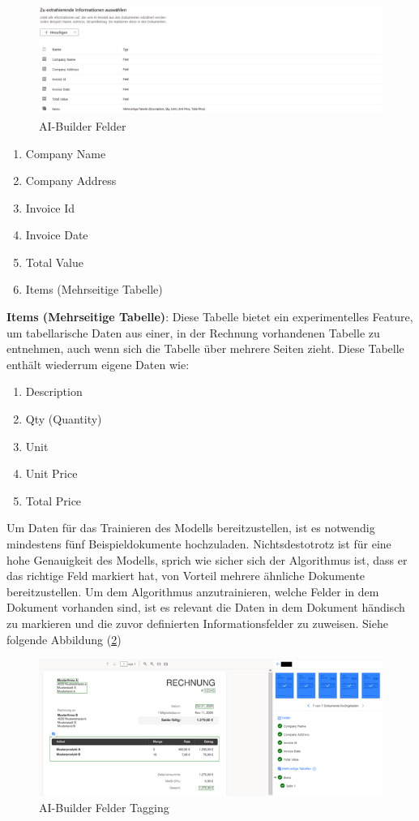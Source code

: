 \begin{figure}[h]
    \centering
    \includegraphics[scale=0.5]{sections/cloud-computing/images/ai-builder-fields.png}
    \caption{AI-Builder Felder}
    \label{fig:ai-builder-fields-figure}
\end{figure}

\begin{enumerate}
    \item Company Name
    \item Company Address
    \item Invoice Id
    \item Invoice Date
    \item Total Value
    \item Items (Mehrseitige Tabelle)
\end{enumerate}

\textbf{Items (Mehrseitige Tabelle)}: Diese Tabelle bietet ein experimentelles Feature, um tabellarische Daten aus einer, in der Rechnung vorhandenen Tabelle zu entnehmen, auch wenn sich die Tabelle über mehrere Seiten zieht. Diese Tabelle enthält wiederrum eigene Daten wie:

\label{enum:InvoiceItemsAttributs}
\begin{enumerate}
    \item Description
    \item Qty (Quantity)
    \item Unit
    \item Unit Price
    \item Total Price
\end{enumerate}


Um Daten für das Trainieren des Modells bereitzustellen, ist es notwendig mindestens fünf Beispieldokumente hochzuladen. Nichtsdestotrotz ist für eine hohe Genauigkeit des Modells, sprich wie sicher sich der Algorithmus ist, dass er das richtige Feld markiert hat, von Vorteil mehrere ähnliche Dokumente bereitzustellen.
Um dem Algorithmus anzutrainieren, welche Felder in dem Dokument vorhanden sind, ist es relevant die Daten in dem Dokument händisch zu markieren und die zuvor definierten Informationsfelder zu zuweisen. Siehe folgende Abbildung (\ref{fig:ai-builder-tagging-figure})

\begin{figure}[h]
    \centering
    \includegraphics[scale=0.9]{sections/cloud-computing/images/ai-builder-tagging.png}
    \caption{AI-Builder Felder Tagging}
    \label{fig:ai-builder-tagging-figure}
\end{figure}